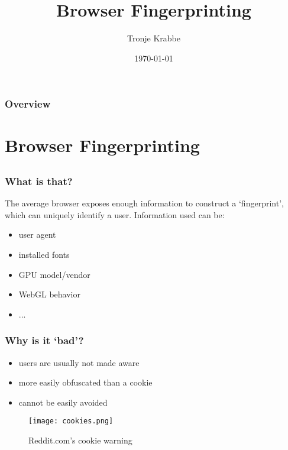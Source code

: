 \documentclass{beamer}
\title[BSc Thesis]{Browser Fingerprinting}
\author{Tronje Krabbe}
\institute[UHH]
{
Uni Hamburg \\
Working Group on Security and Privacy\\
}
\date{\today}
\begin{document}
\begin{frame}
\titlepage
\end{frame}

\begin{frame}
\frametitle{Overview}
\tableofcontents
\end{frame}



\section{Browser Fingerprinting}

\subsection{}


\begin{frame}
    \frametitle{What is that?}
    The average browser exposes enough information to construct
    a `fingerprint', which can uniquely identify a user. Information used can be:
    \begin{itemize}
        \item user agent
        \item installed fonts
        \item GPU model/vendor
        \item WebGL behavior
        \item ...
    \end{itemize}
\end{frame}


\begin{frame}
    \frametitle{Why is it `bad'?}
    \begin{itemize}
        \item users are usually not made aware
        \item more easily obfuscated than a cookie
        \item cannot be easily avoided
    \end{itemize}

    \begin{figure}[h]
    \centering
    \texttt{[image: cookies.png]}
    \caption{Reddit.com's cookie warning}
    \end{figure}

\end{frame}
\end{document}
